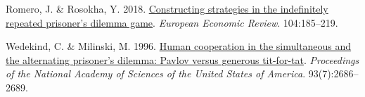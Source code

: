 \documentclass[11pt,preprint]{elsarticle}
\numberwithin{equation}{section}
\numberwithin{figure}{section}
\numberwithin{table}{section}
\newlength{\cslhangindent}
\newenvironment{CSLReferences}[2] %
{\begin{list}{}{%
	\setlength{\itemindent}{0pt}
	\setlength{\leftmargin}{0pt}
	\setlength{\parsep}{0pt}
	\ifodd #1
	\setlength{\leftmargin}{\cslhangindent}
	\setlength{\itemindent}{-1\cslhangindent}
	\fi
	\setlength{\itemsep}{#2\baselineskip}}}
{\end{list}}
\begin{document}
\begin{CSLReferences}{1}{1}
Romero, J. \& Rosokha, Y. 2018.
\href{https://doi.org/10.1016/j.euroecorev.2018.02.008}{Constructing
strategies in the indefinitely repeated prisoner's dilemma game}.
\emph{European Economic Review}. 104:185--219.

Wedekind, C. \& Milinski, M. 1996.
\href{https://doi.org/10.1073/pnas.93.7.2686}{Human cooperation in the
simultaneous and the alternating prisoner's dilemma: Pavlov versus
generous tit-for-tat}. \emph{Proceedings of the National Academy of
Sciences of the United States of America}. 93(7):2686--2689.

\end{CSLReferences}


\end{document}
